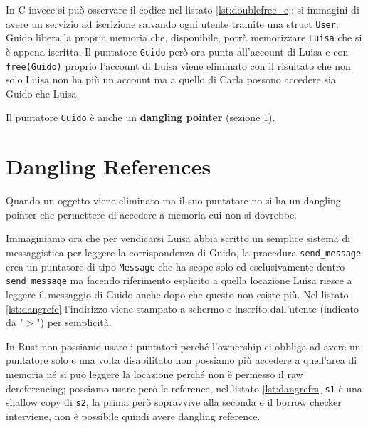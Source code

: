 \documentclass[Lau,binding=0.6cm]{sapthesis}
\begin{document}
In C invece si può osservare il codice nel listato \ref{lst:doublefree_c}: si immagini di avere un servizio ad iscrizione salvando ogni utente tramite una struct \texttt{User}: Guido libera la propria memoria che, disponibile, potrà memorizzare \texttt{Luisa} che si è appena iscritta. Il puntatore \texttt{Guido} però ora punta all'account di Luisa e con \texttt{free(Guido)} proprio l'account di Luisa viene eliminato con il risultato che non solo Luisa non ha più un account ma a quello di Carla possono accedere sia Guido che Luisa.




Il puntatore \texttt{Guido} è anche un \textbf{dangling pointer} (sezione \ref{sec:dangling_reference}).

\section{Dangling References} \label{sec:dangling_reference}
Quando un oggetto viene eliminato ma il suo puntatore no si ha un dangling pointer che permettere di accedere a memoria cui non si dovrebbe.

Immaginiamo ora che per vendicarsi Luisa abbia scritto un semplice sistema di messaggistica per leggere la corrispondenza di Guido, la procedura \texttt{send\_message} crea un puntatore di tipo \texttt{Message} che ha scope solo ed esclusivamente dentro \texttt{send\_message} ma facendo riferimento esplicito a quella locazione Luisa riesce a leggere il messaggio di Guido anche dopo che questo non esiste più. Nel listato \ref{lst:dangrefc} l'indirizzo viene stampato a schermo e inserito dall'utente (indicato da "$>$") per semplicità.




In Rust non possiamo usare i puntatori perché l'ownership ci obbliga ad avere un puntatore solo e una volta disabilitato non possiamo più accedere a quell'area di memoria né si può leggere la locazione perché non è permesso il raw dereferencing; possiamo usare però le reference, nel listato \ref{lst:dangrefrs} \colorbox{backcolour}{\texttt{s1}} è una shallow copy di \texttt{s2}, la prima però sopravvive alla seconda e il borrow checker interviene, non è possibile quindi avere dangling reference.
\end{document}
